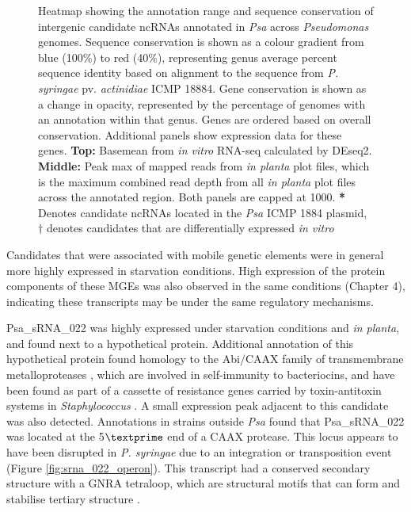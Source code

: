 \begin{figure}[H]
    \caption[Sequence conservation and expression of candidate ncRNAs]{Heatmap showing the annotation range and sequence conservation of intergenic candidate ncRNAs annotated in \textit{Psa} across \textit{Pseudomonas} genomes. Sequence conservation is shown as a colour gradient from blue (100\%) to red (40\%), representing genus average percent sequence identity based on alignment to the sequence from \textit{P. syringae} pv. \textit{actinidiae} ICMP 18884. Gene conservation is shown as a change in opacity, represented by the percentage of genomes with an annotation within that genus. Genes are ordered based on overall conservation. Additional panels show expression data for these genes. \textbf{Top:} Basemean from \textit{in vitro} RNA-seq calculated by DEseq2. \textbf{Middle:} Peak max of mapped reads from \textit{in planta} plot files, which is the maximum combined read depth from all \textit{in planta} plot files across the annotated region. Both panels are capped at 1000. \textbf{*} Denotes candidate ncRNAs located in the \textit{Psa} ICMP 1884 plasmid, \textbf{$\dagger$} denotes candidates that are differentially expressed \textit{in vitro}}
    \label{fig:candidate_heatmap}
\end{figure}
\newpage

Candidates that were associated with mobile genetic elements were in general more highly expressed in starvation conditions. High expression of the protein components of these MGEs was also observed in the same conditions (Chapter 4), indicating these transcripts may be under the same regulatory mechanisms. 

Psa\_sRNA\_022 was highly expressed under starvation conditions and \textit{in planta}, and found next to a hypothetical protein. Additional annotation of this hypothetical protein found homology to the Abi$/$CAAX family of transmembrane metalloproteases \citep{Kjos2010-yq}, which are involved in self-immunity to bacteriocins, and have been found as part of a cassette of resistance genes carried by toxin-antitoxin systems in \textit{Staphylococcus} \citep{Bukowski2017-gd}.  A small expression peak adjacent to this candidate was also detected. Annotations in strains outside \textit{Psa} found that Psa\_sRNA\_022 was located at the 5$\textprime$ end of a CAAX protease. This locus appears to have been disrupted in \textit{P. syringae} due to an integration or transposition event (Figure \ref{fig:srna_022_operon}). This transcript had a conserved secondary structure with a GNRA tetraloop, which are structural motifs that can form and stabilise tertiary structure \citep{Fiore2013-mf}. 

